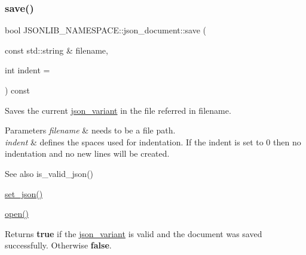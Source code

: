 \subsubsection{\texorpdfstring{save()}{save()}\hspace{0.1cm}{\footnotesize\ttfamily [2/3]}}
{\footnotesize\ttfamily bool J\+S\+O\+N\+L\+I\+B\+\_\+\+N\+A\+M\+E\+S\+P\+A\+C\+E\+::json\+\_\+document\+::save (\begin{DoxyParamCaption}\item[{const std\+::string \&}]{filename,  }\item[{int}]{indent = {} }\end{DoxyParamCaption}) const}



Saves the current \hyperlink{classJSONLIB__NAMESPACE_1_1json__variant}{json\+\_\+variant} in the file referred in {\ttfamily filename}. 


\begin{DoxyParams}{Parameters}
{\em filename} & needs to be a file path. \\
\hline
{\em indent} & defines the spaces used for indentation. If the indent is set to 0 then no indentation and no new lines will be created. \\
\hline
\end{DoxyParams}
\begin{DoxySeeAlso}{See also}
is\+\_\+valid\+\_\+json() 

\hyperlink{classJSONLIB__NAMESPACE_1_1json__document_a5a72e4dc0b37b95c70baefad930b5b71}{set\+\_\+json()} 

\hyperlink{classJSONLIB__NAMESPACE_1_1json__document_a08e509059e628742f35716dddce2d740}{open()} 
\end{DoxySeeAlso}
\begin{DoxyReturn}{Returns}
{\bfseries true} if the \hyperlink{classJSONLIB__NAMESPACE_1_1json__variant}{json\+\_\+variant} is valid and the document was saved successfully. Otherwise {\bfseries false}. 
\end{DoxyReturn}
\mbox{\label{classJSONLIB__NAMESPACE_1_1json__document_a861865e1aae02c2de80eb60a4a8bd668}} 
